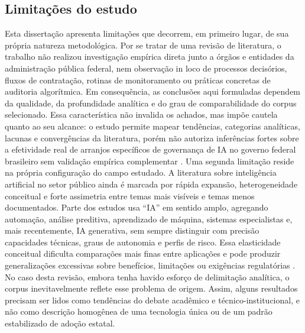 \documentclass[12pt,a4paper]{article}
\begin{document}
\subsection{Limitações do estudo}
\label{sec:orgb0c5a78}
Esta dissertação apresenta limitações que decorrem, em primeiro lugar, de sua própria natureza metodológica. Por se tratar de uma revisão de literatura, o trabalho não realizou investigação empírica direta junto a órgãos e entidades da administração pública federal, nem observação in loco de processos decisórios, fluxos de contratação, rotinas de monitoramento ou práticas concretas de auditoria algorítmica. Em consequência, as conclusões aqui formuladas dependem da qualidade, da profundidade analítica e do grau de comparabilidade do corpus selecionado. Essa característica não invalida os achados, mas impõe cautela quanto ao seu alcance: o estudo permite mapear tendências, categorias analíticas, lacunas e convergências da literatura, porém não autoriza inferências fortes sobre a efetividade real de arranjos específicos de governança de IA no governo federal brasileiro sem validação empírica complementar \autocite{madan2022ai} \autocite{serra2024a}.
Uma segunda limitação reside na própria configuração do campo estudado. A literatura sobre inteligência artificial no setor público ainda é marcada por rápida expansão, heterogeneidade conceitual e forte assimetria entre temas mais visíveis e temas menos documentados. Parte dos estudos usa “IA” em sentido amplo, agregando automação, análise preditiva, aprendizado de máquina, sistemas especialistas e, mais recentemente, IA generativa, sem sempre distinguir com precisão capacidades técnicas, graus de autonomia e perfis de risco. Essa elasticidade conceitual dificulta comparações mais finas entre aplicações e pode produzir generalizações excessivas sobre benefícios, limitações ou exigências regulatórias \autocite{criado2024artificial} \autocite{lyrio2025emerging} \autocite{mariano2026inteligencia}. No caso desta revisão, embora tenha havido esforço de delimitação analítica, o corpus inevitavelmente reflete esse problema de origem. Assim, alguns resultados precisam ser lidos como tendências do debate acadêmico e técnico-institucional, e não como descrição homogênea de uma tecnologia única ou de um padrão estabilizado de adoção estatal.
\end{document}
